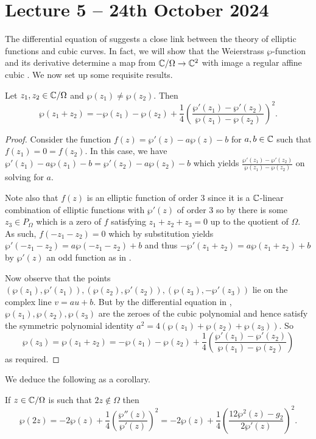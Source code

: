 \section{Lecture 5 -- 24th October 2024}\label{sec: lecture 5}
The differential equation of  suggests a close link between the theory of elliptic functions and cubic curves. In fact, we will show that the Weierstrass $\wp$-function and its derivative determine a map from $\mathbb{C}/\Omega\to\mathbb{C}^{2}$ with image a regular affine cubic . We now set up some requisite results. 
\begin{proposition}\label{prop: addition theorem}
    Let $z_{1},z_{2}\in\mathbb{C}/\Omega$ and $\wp(z_{1})\neq\wp(z_{2})$. Then 
    $$\wp(z_{1}+z_{2})=-\wp(z_{1})-\wp(z_{2})+\frac{1}{4}\left(\frac{\wp'(z_{1})-\wp'(z_{2})}{\wp(z_{1})-\wp(z_{2})}\right)^{2}.$$
\end{proposition}
\begin{proof}
    Consider the function $f(z)=\wp'(z)-a\wp(z)-b$ for $a,b\in\mathbb{C}$ such that $f(z_{1})=0=f(z_{2})$. In this case, we have $\wp'(z_{1})-a\wp(z_{1})-b=\wp'(z_{2})-a\wp(z_{2})-b$ which yields $\frac{\wp'(z_{1})-\wp'(z_{2})}{\wp(z_{1})-\wp(z_{2})}$ on solving for $a$. 

    Note also that $f(z)$ is an elliptic function of order 3 since it is a $\mathbb{C}$-linear combination of elliptic functions with $\wp'(z)$ of order 3 so by  there is some $z_{3}\in P_{\Omega}$ which is a zero of $f$ satisfying $z_{1}+z_{2}+z_{3}=0$ up to the quotient of $\Omega$. As such, $f(-z_{1}-z_{2})=0$ which by substitution yields $\wp'(-z_{1}-z_{2})=a\wp(-z_{1}-z_{2})+b$ and thus $-\wp'(z_{1}+z_{2})=a\wp(z_{1}+z_{2})+b$ by $\wp'(z)$ an odd function as in . 

    Now observe that the points $(\wp(z_{1}),\wp'(z_{1})), (\wp(z_{2}),\wp'(z_{2})),(\wp(z_{3}),-\wp'(z_{3}))$ lie on the complex line $v=au+b$. But by the differential equation in , $\wp(z_{1}),\wp(z_{2}),\wp(z_{3})$ are the zeroes of the cubic polynomial and hence satisfy the symmetric polynomial identity $a^{2}=4(\wp(z_{1})+\wp(z_{2})+\wp(z_{3}))$. So 
    $$\wp(z_{3})=\wp(z_{1}+z_{2})=-\wp(z_{1})-\wp(z_{2})+\frac{1}{4}\left(\frac{\wp'(z_{1})-\wp'(z_{2})}{\wp(z_{1})-\wp(z_{2})}\right)$$
    as required. 
\end{proof}
We deduce the following as a corollary. 
\begin{corollary}\label{corr: corollary of addition theorem}
    If $z\in\mathbb{C}/\Omega$ is such that $2z\notin\Omega$ then 
    $$\wp(2z)=-2\wp(z)+\frac{1}{4}\left(\frac{\wp''(z)}{\wp'(z)}\right)^{2}=-2\wp(z)+\frac{1}{4}\left(\frac{12\wp^{2}(z)-g_{2}}{2\wp'(z)}\right)^{2}.$$
\end{corollary}
